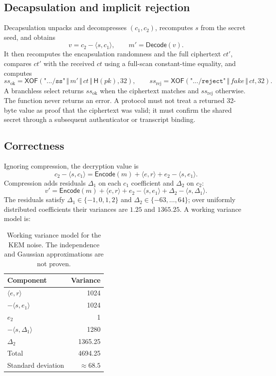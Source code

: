 \documentclass[11pt,a4paper]{article}
\theoremstyle{plain}
\theoremstyle{definition}
\theoremstyle{remark}
\newcommand{\concat}{\,\Vert\,}
\newcommand{\Hash}{\mathsf{H}}
\newcommand{\XOF}{\mathsf{XOF}}
\newcommand{\Encode}{\mathsf{Encode}}
\newcommand{\Decode}{\mathsf{Decode}}
\begin{document}
\subsection{Decapsulation and implicit rejection}

Decapsulation unpacks and decompresses $(c_1,c_2)$, recomputes
$s$ from the secret seed, and obtains
\[
 v=c_2-\langle s,c_1\rangle,\qquad m'=\Decode(v).
\]
It then recomputes the encapsulation randomness and the full ciphertext
$ct'$, compares $ct'$ with the received $ct$ using a full-scan
constant-time equality, and computes
\[
 ss_{\mathrm{ok}}=\XOF(\texttt{".../ss"}\concat m'\concat ct\concat
 \Hash(pk),32), \qquad
 ss_{\mathrm{rej}}=\XOF(\texttt{".../reject"}\concat\mathit{fake}\concat
 ct,32).
\]
A branchless select returns $ss_{\mathrm{ok}}$ when the ciphertext
matches and $ss_{\mathrm{rej}}$ otherwise.  The function never returns
an error.  A protocol must not treat a returned 32-byte value as proof
that the ciphertext was valid; it must confirm the shared secret through
a subsequent authenticator or transcript binding.

\subsection{Correctness}

Ignoring compression, the decryption value is
\[
 c_2-\langle s,c_1\rangle
 = \Encode(m)+\langle e,r\rangle+e_2-\langle s,e_1\rangle.
\]
Compression adds residuals $\Delta_1$ on each $c_1$ coefficient and
$\Delta_2$ on $c_2$:
\[
 v'=\Encode(m)+\langle e,r\rangle+e_2-\langle s,e_1\rangle
 +\Delta_2-\langle s,\Delta_1\rangle.
\]
The residuals satisfy $\Delta_1\in\{-1,0,1,2\}$ and
$\Delta_2\in\{-63,\ldots,64\}$; over uniformly distributed coefficients
their variances are $1.25$ and $1365.25$.  A working variance model is:

\begin{table}[t]
\centering
\small
\begin{tabular}{@{}lr@{}}
\toprule
Component & Variance \\
\midrule
$\langle e,r\rangle$ & 1024 \\
$-\langle s,e_1\rangle$ & 1024 \\
$e_2$ & 1 \\
$-\langle s,\Delta_1\rangle$ & 1280 \\
$\Delta_2$ & 1365.25 \\
\midrule
Total & 4694.25 \\
Standard deviation & $\approx 68.5$ \\
\bottomrule
\end{tabular}
\caption{Working variance model for the KEM noise.  The independence and
Gaussian approximations are not proven.}
\label{tab:noise}
\end{table}
\end{document}
